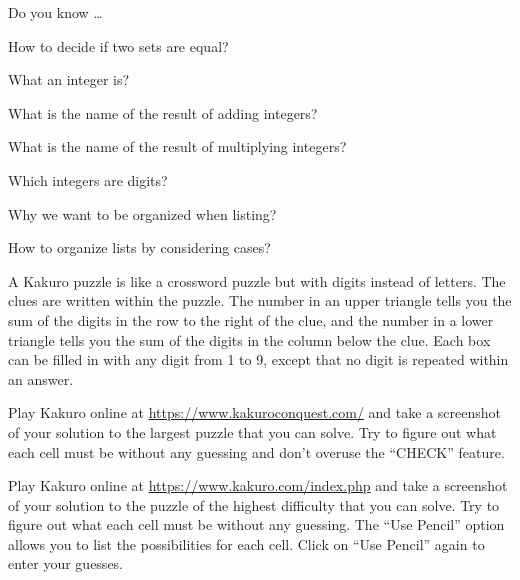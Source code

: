 \begin{exer}[\exerR] %
\label{exer_dyk_digits_sets}
    Do you know \ldots
        \begin{exerpart}
            \item How to decide if two sets are equal?
            \item What an integer is?
            \item What is the name of the result of adding integers?  
            \item What is the name of the result of multiplying integers?
            \item Which integers are digits? 
            \item Why we want to be organized when listing? 
            \item How to organize lists by considering cases?
        \end{exerpart}
\end{exer}

\begin{exer}[\exerE]%
\label{exer_play_Kakuro} 
    A Kakuro puzzle is like a crossword puzzle but with digits instead of letters. The clues are written within the puzzle.  The number in an upper triangle tells you the sum of the digits in the row to the right of the clue, and the number in a lower triangle tells you the sum of the digits in the column below the clue.  Each box can be filled in with any digit from 1 to 9, except that no digit is repeated within an answer.     
        \begin{exerpart}
            \item Play Kakuro online at 
            \url{https://www.kakuroconquest.com/} 
            and take a screenshot of your solution to the largest puzzle that you can solve. Try to figure out what each cell must be without any guessing and don't overuse the ``CHECK'' feature.
            \item Play Kakuro online at 
            \url{https://www.kakuro.com/index.php} 
            and take a screenshot of your solution to the puzzle of the highest difficulty that you can solve. Try to figure out what each cell must be without any guessing. The ``Use Pencil'' option allows you to list the possibilities for each cell.  Click on ``Use Pencil'' again to enter your guesses.
        \end{exerpart}
\end{exer}

